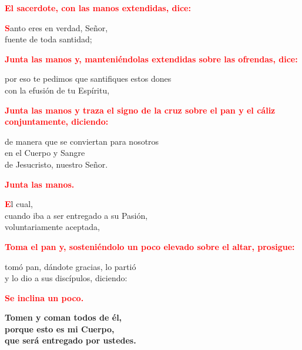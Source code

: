 \documentclass[12pt, letterpaper, spanish]{report}
\begin{document}
\large{\bfseries \textcolor{red}{El sacerdote, con las manos extendidas, dice:}}\newline

\Large \lettrine{\bfseries \textcolor{red}{S}}{}anto eres en verdad, Se\~nor,\\
fuente de toda santidad;\newline

\large{\bfseries \textcolor{red}{Junta las manos y, manteni\'endolas extendidas sobre las ofrendas, dice:}}\newline

\Large por eso te pedimos que santifiques estos dones\\
con la efusi\'on de tu Esp\'iritu,\newline

\large{\bfseries \textcolor{red}{Junta las manos y traza el signo de la cruz sobre el pan y el c\'aliz conjuntamente, diciendo:}}\newline

\Large de manera que se conviertan para nosotros\\
en el Cuerpo y \Huge{\textcolor{red}{}} \Large Sangre\\
de Jesucristo, nuestro Se\~nor.\newline

\large{\bfseries \textcolor{red}{Junta las manos.}}\newline

\Large \lettrine{\bfseries \textcolor{red}{E}}{}l cual,\\
cuando iba a ser entregado a su Pasi\'on,\\
voluntariamente aceptada,\newline

\large{\bfseries \textcolor{red}{Toma el pan y, sosteni\'endolo un poco elevado sobre el altar, prosigue:}}\newline

\Large tom\'o pan, d\'andote gracias, lo parti\'o\\
y lo dio a sus disc\'ipulos, diciendo:\newline

\large{\bfseries \textcolor{red}{Se inclina un poco.}} \newline

\LARGE{ \bfseries{ Tomen y coman todos de \'el,\\
porque esto es mi Cuerpo,\\
que ser\'a entregado por ustedes.}}\newline
\end{document}
